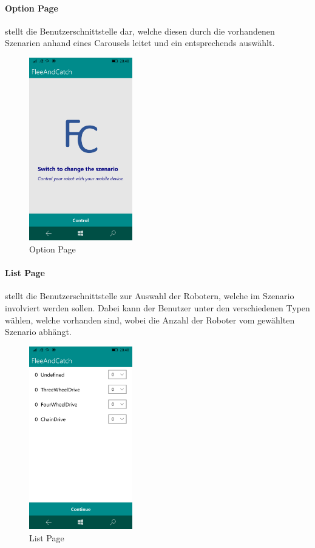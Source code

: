 \newpage
\paragraph{Option Page} stellt die Benutzerschnittstelle dar, welche diesen durch die vorhandenen Szenarien anhand eines Carousels leitet und ein entsprechends auswählt.

\begin{figure}[h]
	\begin{center}
		\includegraphics[width=0.4\textwidth]{images/implementation/option.png}
	\end{center}	
	\caption{Option Page}
	\label{fig:option}
\end{figure}

\newpage
\paragraph{List Page} stellt die Benutzerschnittstelle zur Auswahl der Robotern, welche im Szenario involviert werden sollen. Dabei kann der Benutzer unter den verschiedenen Typen wählen, welche vorhanden sind, wobei die Anzahl der Roboter vom gewählten Szenario abhängt.

\begin{figure}[h]
	\begin{center}
		\includegraphics[width=0.4\textwidth]{images/implementation/list.png}
	\end{center}	
	\caption{List Page}
	\label{fig:list}
\end{figure}

